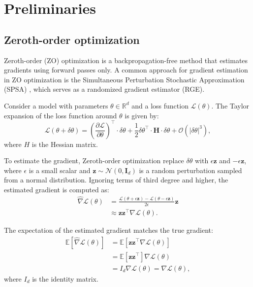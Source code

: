 





\section{Preliminaries}
\label{sec:preliminaries}
\subsection{Zeroth-order optimization}
Zeroth-order (ZO) optimization is a backpropagation-free method that estimates gradients using forward passes only. A common approach for gradient estimation in ZO optimization is the Simultaneous Perturbation Stochastic Approximation (SPSA) \citep{spall1992multivariate}, which serves as a randomized gradient estimator (RGE).

Consider a model with parameters $\theta \in \mathbb{R}^d$ and a loss function $\mathcal{L}(\theta)$. The Taylor expansion of the loss function around $\theta$ is given by:
\begin{equation}
\mathcal{L}(\theta + \delta \theta) = \left( \frac{\partial \mathcal{L}}{\partial \theta} \right)^\top \cdot \delta \theta + \frac{1}{2} \delta \theta^\top \cdot \mathbf{H} \cdot \delta \theta + \mathcal{O}(|\delta \theta|^3),
\end{equation}
where $H$ is the Hessian matrix.

To estimate the gradient, Zeroth-order optimization  replace $\delta \theta$ with $\epsilon \mathbf{z}$ and $-\epsilon \mathbf{z}$, where $\epsilon$ is a small scalar and $\mathbf{z} \sim \mathcal{N}(0, \bm{I}_d)$ is a random perturbation sampled from a normal distribution. Ignoring terms of third degree and higher, the estimated gradient is computed as:
\begin{align}
\widehat{\nabla} \mathcal{L}(\theta)
&= \frac{\mathcal{L}(\theta + \epsilon \mathbf{z}) - \mathcal{L}(\theta - \epsilon \mathbf{z})}{2 \epsilon} \mathbf{z} \\
&\approx \mathbf{z}\mathbf{z}^\top \nabla \mathcal{L}(\theta).
\end{align}

The expectation of the estimated gradient matches the true gradient:
\begin{align}
\mathbb{E}[\widehat{\nabla} \mathcal{L}(\theta)]
&= \mathbb{E}[\mathbf{z}\mathbf{z}^\top \nabla \mathcal{L}(\theta)] \\
&= \mathbb{E}[\mathbf{z}\mathbf{z}^\top] \nabla \mathcal{L}(\theta) \\
&= I_d \nabla \mathcal{L}(\theta) = \nabla \mathcal{L}(\theta),
\end{align}
where $I_d$ is the identity matrix.

